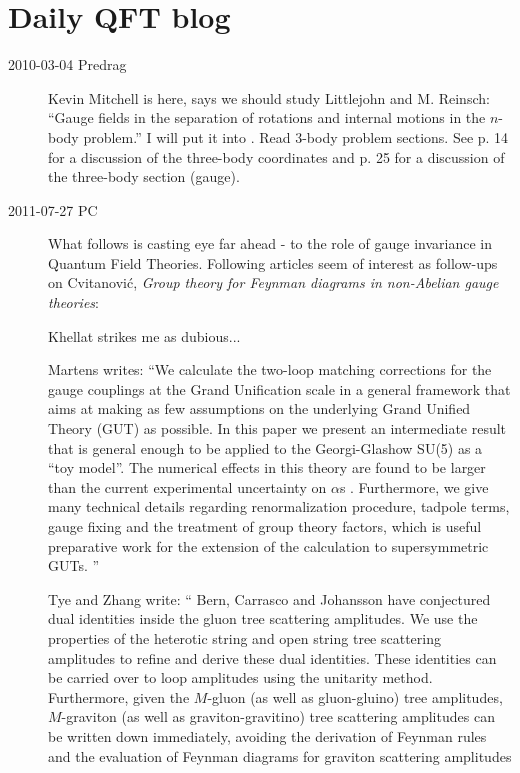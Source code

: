 
\chapter{Daily QFT blog}
\label{c-DailyBlog}

\begin{description}

\item[2010-03-04 Predrag]
Kevin Mitchell is here, says we should study Littlejohn and
M. Reinsch: ``Gauge fields in the separation of
rotations and internal motions in the $n$-body problem.'' I
will put it into . Read 3-body problem
sections. See p. 14 for a discussion of the three-body
coordinates and p. 25 for a discussion of the three-body
section (gauge).



\item[2011-07-27 PC]
What follows is casting eye far ahead - to the role of gauge invariance
in Quantum Field Theories.
Following articles seem of interest as follow-ups on
Cvitanovi\'c, {\em Group theory for {Feynman} diagrams in
non-{Abelian} gauge theories}:

Khellat strikes me as dubious...

Martens writes: ``We calculate the two-loop matching corrections for the
   gauge couplings at the Grand Unification scale in a general framework
   that aims at making as few assumptions on the underlying Grand Unified
   Theory (GUT) as possible. In this paper we present an intermediate
   result that is general enough to be applied to the Georgi-Glashow
   SU(5) as a ``toy model''. The numerical effects in this theory are
   found to be larger than the current experimental uncertainty on $\alpha$s .
   Furthermore, we give many technical details regarding renormalization
   procedure, tadpole terms, gauge fixing and the treatment of group
   theory factors, which is useful preparative work for the extension of
   the calculation to supersymmetric GUTs.
   ''

Tye and Zhang write: ``
Bern, Carrasco and Johansson have conjectured dual
   identities inside the gluon tree scattering amplitudes.
   We use the properties of the heterotic string and open string tree
   scattering amplitudes to refine and derive these dual identities.
   These identities can be carried over to loop amplitudes using the
   unitarity method. Furthermore, given the $M$-gluon (as well as
   gluon-gluino) tree amplitudes, $M$-graviton (as well as
   graviton-gravitino) tree scattering amplitudes can be written down
   immediately, avoiding the derivation of Feynman rules and the
   evaluation of Feynman diagrams for graviton scattering amplitudes


\end{description}
